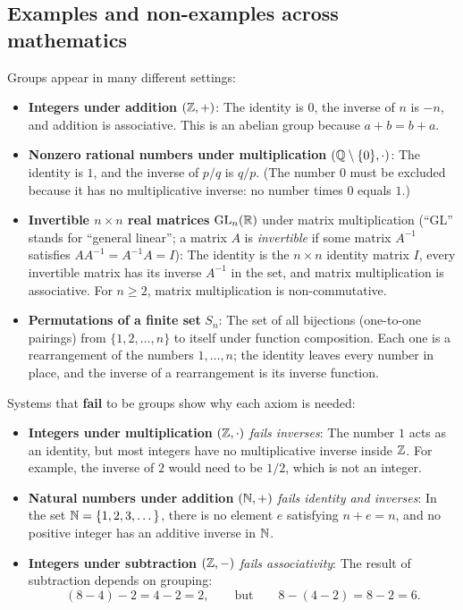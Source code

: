 \subsection{Examples and non-examples across mathematics}

Groups appear in many different settings:
\begin{itemize}
\item \textbf{Integers under addition} $(\mathbb{Z}, +)$: The identity is $0$, the inverse of $n$ is $-n$, and addition is associative. This is an abelian group because $a+b = b+a$.
\item \textbf{Nonzero rational numbers under multiplication} $(\mathbb{Q} \setminus \{0\}, \cdot)$: The identity is $1$, and the inverse of $p/q$ is $q/p$. (The number $0$ must be excluded because it has no multiplicative inverse: no number times $0$ equals $1$.)
\item \textbf{Invertible $n \times n$ real matrices} $\mathrm{GL}_n(\mathbb{R})$ under matrix multiplication (``GL'' stands for ``general linear''; a matrix $A$ is \emph{invertible} if some matrix $A^{-1}$ satisfies $AA^{-1} = A^{-1}A = I$): The identity is the $n \times n$ identity matrix $I$, every invertible matrix has its inverse $A^{-1}$ in the set, and matrix multiplication is associative. For $n \ge 2$, matrix multiplication is non-commutative.
\item \textbf{Permutations of a finite set} $S_n$: The set of all bijections (one-to-one pairings) from $\{1, 2, \dots, n\}$ to itself under function composition. Each one is a rearrangement of the numbers $1, \dots, n$; the identity leaves every number in place, and the inverse of a rearrangement is its inverse function.
\end{itemize}

Systems that \textbf{fail} to be groups show why each axiom is needed:
\begin{itemize}
\item \textbf{Integers under multiplication} $(\mathbb{Z}, \cdot)$ \emph{fails inverses}: The number $1$ acts as an identity, but most integers have no multiplicative inverse inside $\mathbb{Z}$. For example, the inverse of $2$ would need to be $1/2$, which is not an integer.
\item \textbf{Natural numbers under addition} $(\mathbb{N}, +)$ \emph{fails identity and inverses}: In the set $\mathbb{N} = \{1, 2, 3, \dots\}$, there is no element $e$ satisfying $n + e = n$, and no positive integer has an additive inverse in $\mathbb{N}$.
\item \textbf{Integers under subtraction} $(\mathbb{Z}, -)$ \emph{fails associativity}: The result of subtraction depends on grouping:
\[
(8 - 4) - 2 = 4 - 2 = 2, \qquad \text{but} \qquad 8 - (4 - 2) = 8 - 2 = 6.
\]
\end{itemize}

